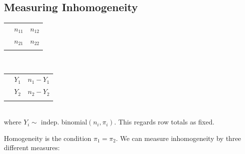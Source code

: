 \documentclass[11pt]{elegantbook}
\begin{document}
\subsection{Measuring Inhomogeneity}
\begin{table}[htbp]
    \centering
    \begin{tabular}{rllll}
        \cline{2-5}
        \multicolumn{1}{r|}{\multirow{2}{*}{}} & \multicolumn{2}{l|}{$n_{11}$} & \multicolumn{2}{l|}{$n_{12}$} \\ \cline{2-5} 
        \multicolumn{1}{r|}{}                   & \multicolumn{2}{l|}{$n_{21}$} & \multicolumn{2}{l|}{$n_{22}$} \\ \cline{2-5}
        \multicolumn{1}{l}{}                    &             &             &             &
    \end{tabular}\\
    \begin{tabular}{rllll}
        \cline{2-5}
        \multicolumn{1}{r|}{\multirow{2}{*}{}} & \multicolumn{2}{l|}{$Y_1$} & \multicolumn{2}{l|}{$n_1-Y_1$} \\ \cline{2-5} 
        \multicolumn{1}{r|}{}                   & \multicolumn{2}{l|}{$Y_2$} & \multicolumn{2}{l|}{$n_2-Y_2$} \\ \cline{2-5}
        \multicolumn{1}{l}{}                    &             &             &             &
    \end{tabular}\\
    where $Y_i\sim$ indep. binomial$(n_i,\pi_i)$. This regards row totals as fixed.
\end{table}
Homogeneity is the condition $\pi_1 = \pi_2$. We can measure inhomogeneity by three different measures:
\end{document}
